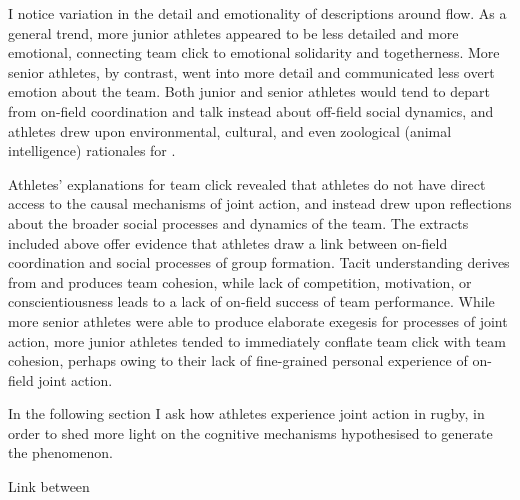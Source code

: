 \begin{CJK}{UTF8}{gbsn}
I notice variation in the detail and emotionality of descriptions around flow. As a general trend, more junior athletes appeared to be less detailed and more emotional, connecting team click to emotional solidarity and togetherness.  More senior athletes, by contrast, went into more detail and communicated less overt emotion about the team.  Both junior and senior athletes would tend to depart from on-field coordination and talk instead about off-field social dynamics, and athletes drew upon environmental, cultural, and even zoological (animal intelligence) rationales for \textcite{moqi}.

Athletes' explanations for team click revealed that athletes do not have direct access to the causal mechanisms of joint action, and instead drew upon reflections about the broader social processes and dynamics of the team.  The extracts included above offer evidence that athletes draw a link between on-field coordination and social processes of group formation.  Tacit understanding derives from and produces team cohesion, while lack of competition, motivation, or conscientiousness leads to a lack of on-field success of team performance.  While more senior athletes were able to produce elaborate exegesis for processes of joint action, more junior athletes tended to immediately conflate team click with team cohesion, perhaps owing to their lack of fine-grained personal experience of on-field joint action.

In the following section I ask how athletes experience joint action in rugby, in order to shed more light on the cognitive mechanisms hypothesised to generate the phenomenon.






Link between








































\end{CJK}
